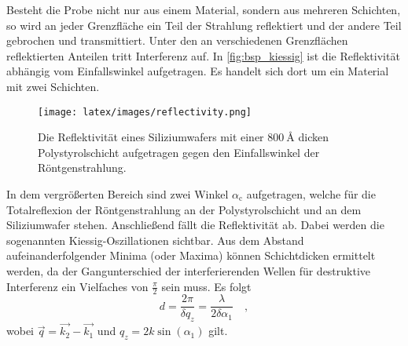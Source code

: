         \noindent 
        Besteht die Probe nicht nur aus einem Material, sondern aus mehreren Schichten, so wird an jeder Grenzfläche ein Teil der Strahlung reflektiert und 
        der andere Teil gebrochen und transmittiert. Unter den an verschiedenen Grenzflächen reflektierten Anteilen tritt Interferenz auf. In 
        \autoref{fig:bsp_kiessig} ist die Reflektivität abhängig vom Einfallswinkel aufgetragen. Es handelt sich dort um ein Material mit zwei Schichten. 
        \begin{figure}
            \centering
            \texttt{[image: latex/images/reflectivity.png]}
            \caption{Die Reflektivität eines Siliziumwafers mit einer $\SI{800}{\angstrom}$ dicken Polystyrolschicht aufgetragen gegen den Einfallswinkel der Röntgenstrahlung. \cite{alte}}
            \label{fig:bsp_kiessig}
        \end{figure}
        In dem vergrößerten Bereich sind zwei Winkel $\alpha_\text{c}$ aufgetragen, welche für die Totalreflexion der Röntgenstrahlung an der Polystyrolschicht 
        und an dem Siliziumwafer stehen. Anschließend fällt die Reflektivität ab. Dabei werden die sogenannten Kiessig-Oszillationen 
        sichtbar. Aus dem Abstand aufeinanderfolgender Minima (oder Maxima) können Schichtdicken ermittelt werden, da der Gangunterschied 
        der interferierenden Wellen für destruktive Interferenz ein Vielfaches von $\frac{\pi}{2}$ sein muss. 
        Es folgt
        \begin{equation}
            d = \frac{2 \pi}{\delta q_z} = \frac{\lambda}{2 \delta \alpha_1}\quad , \label{eqn:bragg}
        \end{equation} 
        wobei $\vec{q} = \vec{k_2} - \vec{k_1}$ und $q_z = 2 k \sin(\alpha_1)$ gilt.

